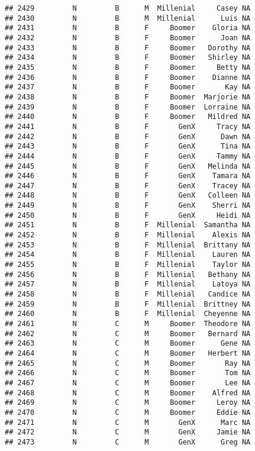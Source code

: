 \documentclass[
]{article}
\begin{document}
\begin{verbatim}
## 2429         N         B      M  Millenial     Casey NA
## 2430         N         B      M  Millenial      Luis NA
## 2431         N         B      F     Boomer    Gloria NA
## 2432         N         B      F     Boomer      Joan NA
## 2433         N         B      F     Boomer   Dorothy NA
## 2434         N         B      F     Boomer   Shirley NA
## 2435         N         B      F     Boomer     Betty NA
## 2436         N         B      F     Boomer    Dianne NA
## 2437         N         B      F     Boomer       Kay NA
## 2438         N         B      F     Boomer  Marjorie NA
## 2439         N         B      F     Boomer  Lorraine NA
## 2440         N         B      F     Boomer   Mildred NA
## 2441         N         B      F       GenX     Tracy NA
## 2442         N         B      F       GenX      Dawn NA
## 2443         N         B      F       GenX      Tina NA
## 2444         N         B      F       GenX     Tammy NA
## 2445         N         B      F       GenX   Melinda NA
## 2446         N         B      F       GenX    Tamara NA
## 2447         N         B      F       GenX    Tracey NA
## 2448         N         B      F       GenX   Colleen NA
## 2449         N         B      F       GenX    Sherri NA
## 2450         N         B      F       GenX     Heidi NA
## 2451         N         B      F  Millenial  Samantha NA
## 2452         N         B      F  Millenial    Alexis NA
## 2453         N         B      F  Millenial  Brittany NA
## 2454         N         B      F  Millenial    Lauren NA
## 2455         N         B      F  Millenial    Taylor NA
## 2456         N         B      F  Millenial   Bethany NA
## 2457         N         B      F  Millenial    Latoya NA
## 2458         N         B      F  Millenial   Candice NA
## 2459         N         B      F  Millenial  Brittney NA
## 2460         N         B      F  Millenial  Cheyenne NA
## 2461         N         C      M     Boomer  Theodore NA
## 2462         N         C      M     Boomer   Bernard NA
## 2463         N         C      M     Boomer      Gene NA
## 2464         N         C      M     Boomer   Herbert NA
## 2465         N         C      M     Boomer       Ray NA
## 2466         N         C      M     Boomer       Tom NA
## 2467         N         C      M     Boomer       Lee NA
## 2468         N         C      M     Boomer    Alfred NA
## 2469         N         C      M     Boomer     Leroy NA
## 2470         N         C      M     Boomer     Eddie NA
## 2471         N         C      M       GenX      Marc NA
## 2472         N         C      M       GenX     Jamie NA
## 2473         N         C      M       GenX      Greg NA

\end{verbatim}
\end{document}
